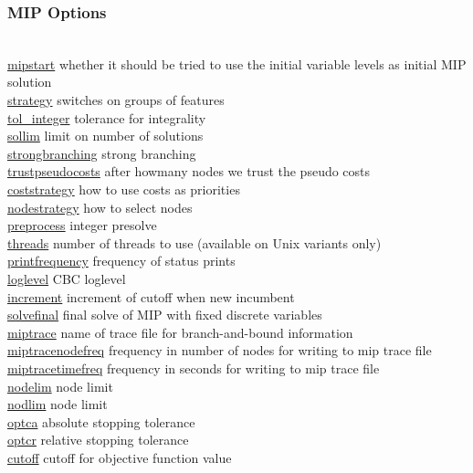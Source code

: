 \subsubsection{MIP Options}
\begin{tabbing}
\hspace {1.3in} \= \\
\hyperlink{mipstart}
{mipstart} \> whether it should be tried to use the initial variable levels as initial MIP solution \\
\hyperlink{strategy}
{strategy} \> switches on groups of features\\
\hyperlink{tol_integer}
{tol\_integer} \> tolerance for integrality \\
\hyperlink{sollim}
{sollim} \> limit on number of solutions \\
\hyperlink{strongbranching}
{strongbranching} \> strong branching \\
\hyperlink{trustpseudocosts}
{trustpseudocosts} \> after howmany nodes we trust the pseudo costs \\
\hyperlink{coststrategy}
{coststrategy} \> how to use costs as priorities \\
\hyperlink{nodestrategy}
{nodestrategy} \> how to select nodes \\
\hyperlink{preprocess}
{preprocess} \> integer presolve \\
\hyperlink{threads}
{threads} \> number of threads to use (available on Unix variants only) \\
\hyperlink{printfrequency}
{printfrequency} \> frequency of status prints \\
\hyperlink{loglevel}
{loglevel} \> CBC loglevel \\
\hyperlink{increment}
{increment} \> increment of cutoff when new incumbent \\
\hyperlink{solvefinal}
{solvefinal} \> final solve of MIP with fixed discrete variables \\
\hyperlink{miptrace}
{miptrace} \> name of trace file for branch-and-bound information \\
\hyperlink{miptracenodefreq}
{miptracenodefreq} \> frequency in number of nodes for writing to mip trace file \\
\hyperlink{miptracetimefreq}
{miptracetimefreq} \> frequency in seconds for writing to mip trace file \\
\hyperlink{nodelim}
{nodelim} \> node limit \\
\hyperlink{nodlim}
{nodlim} \> node limit \\
\hyperlink{optca}
{optca} \> absolute stopping tolerance \\
\hyperlink{optcr}
{optcr} \> relative stopping tolerance \\
\hyperlink{cutoff}
{cutoff} \> cutoff for objective function value
\end{tabbing}



